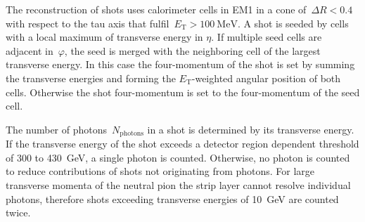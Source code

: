 The reconstruction of shots uses calorimeter cells in EM1 in a cone
of~$\Delta R < 0.4$ with respect to the tau axis that
fulfil~$E_\text{T} > \SI{100}{\MeV}$. A shot is seeded by cells with a local
maximum of transverse energy in $\eta$.
If multiple seed cells are adjacent in~$\varphi$, the seed is merged with the
neighboring cell of the largest transverse energy. In this case the
four-momentum of the shot is set by summing the transverse energies and forming
the $E_\text{T}$-weighted angular position of both cells. Otherwise the shot
four-momentum is set to the four-momentum of the seed cell.

The number of photons~$N_\text{photons}$ in a shot is determined by its
transverse energy. If the transverse energy of the shot exceeds a detector
region dependent threshold of \num{300} to \SI{430}{\GeV}, a single photon is
counted. Otherwise, no photon is counted to reduce contributions of shots not
originating from photons. For large transverse momenta of the neutral pion the
strip layer cannot resolve individual photons, therefore shots exceeding
transverse energies of \SI{10}{\GeV} are counted twice.

